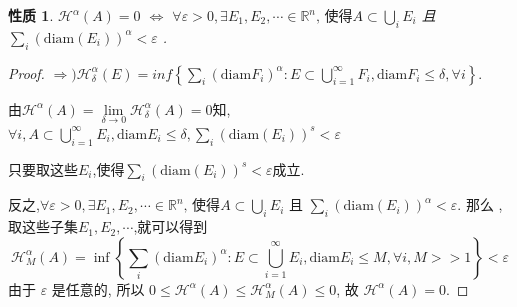 \documentclass[hyperref,a4paper,UTF8]{ctexart}
\newtheorem{property}{{性质}}
\begin{document}
  \begin{property}
    $\mathcal{H}^\alpha(A) = 0$ $\Leftrightarrow$
      $ \forall \varepsilon > 0, \exists E_{1}, E_{2}, \cdots \in  \mathbb{R}^{n}\text{, 使得} A \subset \bigcup\limits_{i} E_{i}$ 且 $\sum\limits_{i}\left(\mathrm{diam}\left(E_{i}\right)\right)^{\alpha}<\varepsilon$ . 
  \end{property}
  \begin{proof}
      $ \Rightarrow) \mathcal{H}^\alpha_\delta(E) = inf \left\{\sum\limits_{i}\left(\mathrm{diam} F_i\right)^\alpha: E \subset \bigcup\limits_{i=1}^{\infty} F_i, \mathrm{diam} F_i \leqslant \delta, \forall i\right\}$. 

      由$ \mathcal{H}^\alpha(A) = \lim\limits_{\delta \to 0} \mathcal{H}_\delta^\alpha(A) = 0$知, $\forall i,A \subset \bigcup\limits_{i=1}^{\infty} E_i, \mathrm{diam} E_i \leqslant \delta, \sum\limits_{i}\left(\mathrm{diam}\left(E_{i}\right)\right)^{s}<\varepsilon$
      
      只要取这些$E_i$,使得$\sum\limits_{i}\left(\mathrm{diam}\left(E_{i}\right)\right)^{s}<\varepsilon$成立.

      反之,$ \forall \varepsilon > 0, \exists E_{1}, E_{2}, \cdots \in  \mathbb{R}^{n}\text{, 使得} A \subset \bigcup\limits_{i} E_{i}$ 且 $\sum\limits_{i}\left(\mathrm{diam}\left(E_{i}\right)\right)^{\alpha}<\varepsilon$. 
      那么 ,取这些子集$E_{1}, E_{2}, \cdots$,就可以得到
      $$\mathcal{H}^\alpha_M(A) = \inf \left\{\sum_{i}\left(\mathrm{diam} E_i\right)^\alpha: E \subset \bigcup_{i=1}^{\infty} E_i, \mathrm{diam} E_i \leqslant M,\forall i,M >> 1  \right\} < \varepsilon$$由于 $\varepsilon$ 是任意的, 所以 $0 \leqslant \mathcal{H}^\alpha(A) \leqslant \mathcal{H}^\alpha_M(A) \leqslant 0 $, 故 $\mathcal{H}^\alpha(A) = 0$.

  \end{proof}

\end{document}
